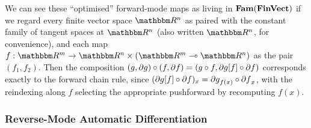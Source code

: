 We can see these ``optimised'' forward-mode maps as living in $\mathbf{Fam}(\mathbf{FinVect})$ if we regard every finite
vector space $\RR^n$ as paired with the constant family of tangent spaces at $\RR^n$ (also written $\RR^n$,
for convenience), and each map $f: \RR^m \to \RR^n \times (\RR^m \linearto \RR^n)$ as the pair $(f_1, f_2)$.
Then the composition $(g, \partial g) \circ (f, \partial f) = (g \circ f, \partial g[f] \circ
\partial f)$ corresponds exactly to the forward chain rule, since $(\partial g[f] \circ \partial
f)_x = {\partial g}_{f(x)} \circ {\partial f}_x$, with the reindexing along $f$ selecting the appropriate
pushforward by recomputing $f(x)$.

\subsubsection{Reverse-Mode Automatic Differentiation}


